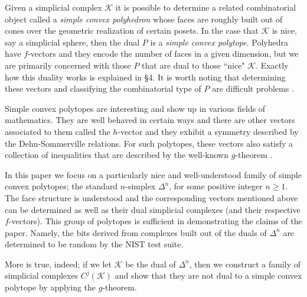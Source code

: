 \documentclass[oneside,12pt]{amsart}
\theoremstyle{definition}
\numberwithin{equation}{section}
\begin{document}
Given a simplicial complex $\mathcal{K}$ it is possible to determine a related combinatorial object called a \textit{simple convex polyhedron} whose faces are roughly built out of cones over the geometric realization of certain posets.  In the case that $\mathcal{K}$ is nice, say a simplicial sphere, then the dual $P$ is a \textit{simple convex polytope}.  Polyhedra have $f$-vectors and they encode the number of faces in a given dimension, but we are primarily concerned with those $P$ that are dual to those ``nice" $\mathcal{K}$.  Exactly how this duality works is explained in \S 4.  It is worth noting that determining these vectors and classifying the combinatorial type of $P$ are difficult problems  \cite{KP}.

Simple convex polytopes are interesting and show up in various fields of mathematics. They are well behaved in certain ways and there are other vectors associated to them called the $h$-vector and they exhibit a symmetry described by the Dehn-Sommerville relations.  For such polytopes, these vectors also satisfy a collection of inequalities that are described by the well-known $g$-theorem \cite{B,BP1}.  

In this paper we focus on a particularly nice and well-understood family of simple convex polytopes; the standard $n$-simplex $\Delta^n$, for some positive integer $n \geq 1$.  The face structure is understood and the corresponding vectors mentioned above can be determined as well as their dual simplicial complexes (and their respective $f$-vectors).  This group of polytopes is sufficient in demonstrating the claims of the paper.  Namely, the bits derived from complexes built out of the duals of $\Delta^n$ are determined to be random by the NIST test suite. 


More is true, indeed; if we let $\mathcal{K}$ be the dual of $\Delta^n$, then we construct a family of simplicial complexes $C^j(\mathcal{K})$ and show that they are not dual to a simple convex polytope by applying the $g$-theorem.  

\end{document}
